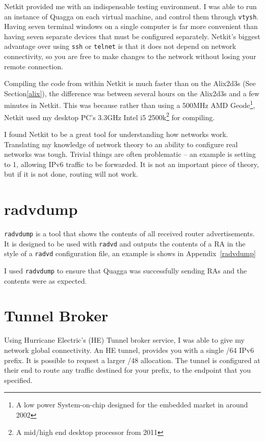 Netkit provided me with an indispensable testing environment. I was able to run
an instance of Quagga on each virtual machine, and control them through
\texttt{vtysh}. Having seven terminal windows on a single computer is far more
convenient than having seven separate devices that must be configured
separately. Netkit's biggest advantage over using \texttt{ssh} or
\texttt{telnet} is that it does not depend on network connectivity, so you
are free to make changes to the network without losing your remote connection.

Compiling the code from within Netkit is much faster than on the Alix2d3s
(See Section\ref{alix}), the difference was between several hours on the
Alix2d3s and a few minutes in Netkit. This was because rather than using a
500MHz AMD Geode\footnote{A low power System-on-chip designed for the embedded
market in around 2002}, Netkit used my desktop PC's 3.3GHz Intel i5
2500k\footnote{A mid/high end desktop processor from 2011} for compiling. 

I found Netkit to be a great tool for understanding how networks work.
Translating my knowledge of network theory to an ability to configure real
networks was tough. Trivial things are often problematic -- an example
is setting  to 1, allowing IPv6
traffic to be forwarded. It is not an important piece of theory, but if it is
not done, routing will not work. 

\section{radvdump}
\texttt{radvdump} is a tool that shows the contents of all received router
advertisements. It is designed to be used with \texttt{radvd} and outputs the
contents of a RA in the style of a \texttt{radvd} configuration file, an
example is shows in Appendix~\ref{radvdump} 

I used \texttt{radvdump} to ensure that Quagga was successfully sending RAs and
the contents were as expected. 

\section{Tunnel Broker}
Using Hurricane Electric's (HE) Tunnel broker service, I was able to give my
network global connectivity. An HE tunnel, provides you with a single /64 IPv6
prefix. It is possible to request a larger /48 allocation. The tunnel is
configured at their end to route any traffic destined for your prefix, to the
endpoint that you specified.  

